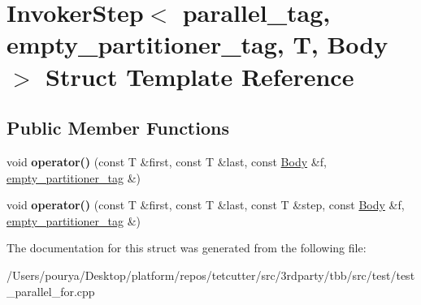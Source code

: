 \hypertarget{structInvokerStep_3_01parallel__tag_00_01empty__partitioner__tag_00_01T_00_01Body_01_4}{}\section{Invoker\+Step$<$ parallel\+\_\+tag, empty\+\_\+partitioner\+\_\+tag, T, Body $>$ Struct Template Reference}
\label{structInvokerStep_3_01parallel__tag_00_01empty__partitioner__tag_00_01T_00_01Body_01_4}
\subsection*{Public Member Functions}
\begin{DoxyCompactItemize}
\item 
\hypertarget{structInvokerStep_3_01parallel__tag_00_01empty__partitioner__tag_00_01T_00_01Body_01_4_a373a749005e8401b68be7b52c865d62b}{}void {\bfseries operator()} (const T \&first, const T \&last, const \hyperlink{classBody}{Body} \&f, \hyperlink{structempty__partitioner__tag}{empty\+\_\+partitioner\+\_\+tag} \&)\label{structInvokerStep_3_01parallel__tag_00_01empty__partitioner__tag_00_01T_00_01Body_01_4_a373a749005e8401b68be7b52c865d62b}

\item 
\hypertarget{structInvokerStep_3_01parallel__tag_00_01empty__partitioner__tag_00_01T_00_01Body_01_4_a0ac074b3a0c3f0d00e92547c87a0830a}{}void {\bfseries operator()} (const T \&first, const T \&last, const T \&step, const \hyperlink{classBody}{Body} \&f, \hyperlink{structempty__partitioner__tag}{empty\+\_\+partitioner\+\_\+tag} \&)\label{structInvokerStep_3_01parallel__tag_00_01empty__partitioner__tag_00_01T_00_01Body_01_4_a0ac074b3a0c3f0d00e92547c87a0830a}

\end{DoxyCompactItemize}


The documentation for this struct was generated from the following file\+:\begin{DoxyCompactItemize}
\item 
/\+Users/pourya/\+Desktop/platform/repos/tetcutter/src/3rdparty/tbb/src/test/test\+\_\+parallel\+\_\+for.\+cpp\end{DoxyCompactItemize}
